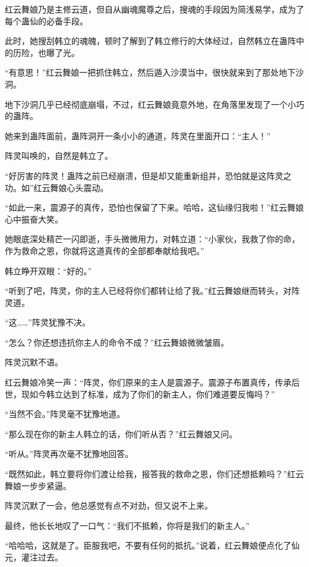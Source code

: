 
\begin{this_body}



红云舞娘乃是主修云道，但自从幽魂魔尊之后，搜魂的手段因为简浅易学，成为了每个蛊仙的必备手段。

此时，她搜刮韩立的魂魄，顿时了解到了韩立修行的大体经过，自然韩立在蛊阵中的历险，也曝了光。

“有意思！”红云舞娘一把抓住韩立，然后遁入沙漠当中，很快就来到了那处地下沙洞。

地下沙洞几乎已经彻底崩塌，不过，红云舞娘竟意外地，在角落里发现了一个小巧的蛊阵。

她来到蛊阵面前，蛊阵洞开一条小小的通道，阵灵在里面开口：“主人！”

阵灵叫唤的，自然是韩立了。

“好厉害的阵灵！蛊阵之前已经崩溃，但是却又能重新组并，恐怕就是这阵灵之功。如”红云舞娘心头震动。

“如此一来，震源子的真传，恐怕也保留了下来。哈哈，这仙缘归我啦！”红云舞娘心中振奋大笑。

她眼底深处精芒一闪即逝，手头微微用力，对韩立道：“小家伙，我救了你的命，作为救命之恩，你就将这道真传的全部都奉献给我吧。”

韩立睁开双眼：“好的。”

“听到了吧，阵灵，你的主人已经将你们都转让给了我。”红云舞娘继而转头，对阵灵道。

“这……”阵灵犹豫不决。

“怎么？你还想违抗你主人的命令不成？”红云舞娘微微皱眉。

阵灵沉默不语。

红云舞娘冷笑一声：“阵灵，你们原来的主人是震源子。震源子布置真传，传承后世，现如今韩立达到了标准，成为了你们的新主人，你们难道要反悔吗？”

“当然不会。”阵灵毫不犹豫地道。

“那么现在你的新主人韩立的话，你们听从否？”红云舞娘又问。

“听从。”阵灵再次毫不犹豫地回答。

“既然如此，韩立要将你们渡让给我，报答我的救命之恩，你们还想抵赖吗？”红云舞娘一步步紧逼。

阵灵沉默了一会，他总感觉有点不对劲，但又说不上来。

最终，他长长地叹了一口气：“我们不抵赖，你将是我们的新主人。”

“哈哈哈，这就是了。臣服我吧，不要有任何的抵抗。”说着，红云舞娘便点化了仙元，灌注过去。


\end{this_body}

